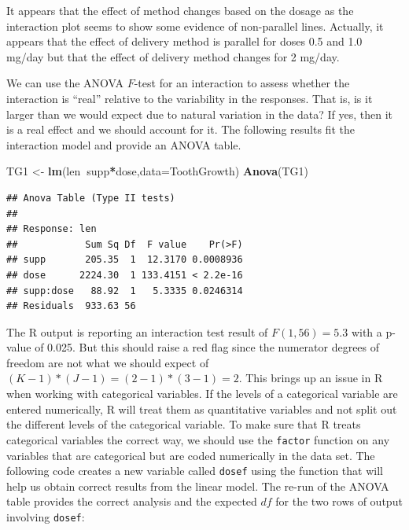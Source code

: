 \documentclass[]{book}
\newenvironment{Shaded}{\begin{snugshade}}{\end{snugshade}}
\newcommand{\KeywordTok}[1]{\textcolor[rgb]{0.13,0.29,0.53}{\textbf{#1}}}
\newcommand{\DataTypeTok}[1]{\textcolor[rgb]{0.13,0.29,0.53}{#1}}
\newcommand{\StringTok}[1]{\textcolor[rgb]{0.31,0.60,0.02}{#1}}
\newcommand{\OperatorTok}[1]{\textcolor[rgb]{0.81,0.36,0.00}{\textbf{#1}}}
\newcommand{\NormalTok}[1]{#1}
\theoremstyle{definition}
\theoremstyle{definition}
\theoremstyle{remark}
\begin{document}
It appears that the effect of method changes based on the dosage as the
interaction plot seems to show some evidence of non-parallel lines.
Actually, it appears that the effect of delivery method is parallel for
doses 0.5 and 1.0 mg/day but that the effect of delivery method changes
for 2 mg/day.

We can use the ANOVA \(F\)-test for an interaction to assess whether the
interaction is ``real'' relative to the variability in the responses.
That is, is it larger than we would expect due to natural variation in
the data? If yes, then it is a real effect and we should account for it.
The following results fit the interaction model and provide an ANOVA
table.

\begin{Shaded}
\begin{Highlighting}[]
\NormalTok{TG1 <-}\StringTok{ }\KeywordTok{lm}\NormalTok{(len}\OperatorTok{~}\NormalTok{supp}\OperatorTok{*}\NormalTok{dose,}\DataTypeTok{data=}\NormalTok{ToothGrowth)}
\KeywordTok{Anova}\NormalTok{(TG1)}
\end{Highlighting}
\end{Shaded}

\begin{verbatim}
## Anova Table (Type II tests)
## 
## Response: len
##            Sum Sq Df  F value    Pr(>F)
## supp       205.35  1  12.3170 0.0008936
## dose      2224.30  1 133.4151 < 2.2e-16
## supp:dose   88.92  1   5.3335 0.0246314
## Residuals  933.63 56
\end{verbatim}

The R output is reporting an interaction test result of \(F(1,56)=5.3\)
with a p-value of 0.025. But this should raise a red flag since the
numerator degrees of freedom are not what we should expect of
\((K-1)*(J-1) = (2-1)*(3-1)=2\). This brings up an issue in R when
working with categorical variables. If the levels of a categorical
variable are entered numerically, R will treat them as quantitative
variables and not split out the different levels of the categorical
variable. To make sure that R treats categorical variables the correct
way, we should use the \texttt{factor} function on any variables that
are categorical but are coded numerically in the data set. The following
code creates a new variable called \texttt{dosef} using the function
that will help us obtain correct results from the linear model. The
re-run of the ANOVA table provides the correct analysis and the expected
\(df\) for the two rows of output involving \texttt{dosef}:
\end{document}
